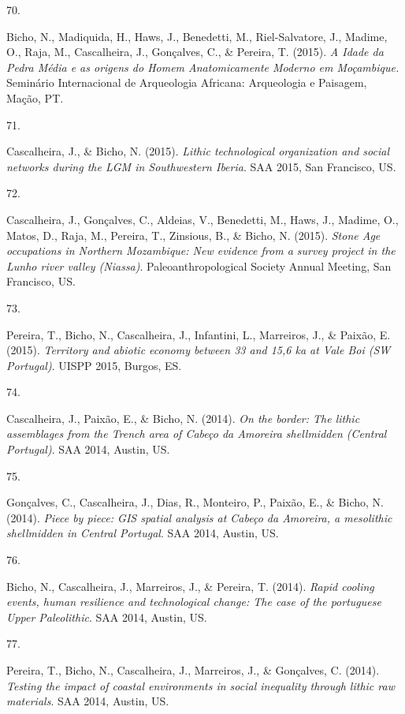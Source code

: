 \documentclass[11pt,a4paper,]{awesome-cv}
\newlength{\cslhangindent}
\newlength{\csllabelwidth}
\newenvironment{CSLReferences}[2] %
 {\begin{list}{}{%
  \setlength{\itemindent}{0pt}
  \setlength{\leftmargin}{0pt}
  \setlength{\parsep}{0pt}
  \ifodd #1
   \setlength{\leftmargin}{\cslhangindent}
   \setlength{\itemindent}{-1\cslhangindent}
  \fi
  \setlength{\itemsep}{#2\baselineskip}}}
 {\end{list}}
\newcommand{\CSLLeftMargin}[1]{\parbox[t]{\csllabelwidth}{\strut#1\strut}}
\newcommand{\CSLRightInline}[1]{\parbox[t]{\linewidth - \csllabelwidth}{\strut#1\strut}}
\begin{document}
\begin{CSLReferences}{0}{0}
\CSLLeftMargin{70. }%
\CSLRightInline{Bicho, N., Madiquida, H., Haws, J., Benedetti, M.,
Riel-Salvatore, J., Madime, O., Raja, M., Cascalheira, J., Gonçalves,
C., \& Pereira, T. (2015). \emph{A Idade da Pedra Média e as origens do
Homem Anatomicamente Moderno em Moçambique.} Seminário Internacional de
Arqueologia Africana: Arqueologia e Paisagem, Mação, PT.}

\CSLLeftMargin{71. }%
\CSLRightInline{Cascalheira, J., \& Bicho, N. (2015). \emph{Lithic
technological organization and social networks during the LGM in
Southwestern Iberia}. SAA 2015, San Francisco, US.}

\CSLLeftMargin{72. }%
\CSLRightInline{Cascalheira, J., Gonçalves, C., Aldeias, V., Benedetti,
M., Haws, J., Madime, O., Matos, D., Raja, M., Pereira, T., Zinsious,
B., \& Bicho, N. (2015). \emph{Stone Age occupations in Northern
Mozambique: New evidence from a survey project in the Lunho river valley
(Niassa)}. Paleoanthropological Society Annual Meeting, San Francisco,
US.}

\CSLLeftMargin{73. }%
\CSLRightInline{Pereira, T., Bicho, N., Cascalheira, J., Infantini, L.,
Marreiros, J., \& Paixão, E. (2015). \emph{Territory and abiotic economy
between 33 and 15,6 ka at Vale Boi (SW Portugal)}. UISPP 2015, Burgos,
ES.}

\CSLLeftMargin{74. }%
\CSLRightInline{Cascalheira, J., Paixão, E., \& Bicho, N. (2014).
\emph{On the border: The lithic assemblages from the Trench area of
Cabeço da Amoreira shellmidden (Central Portugal)}. SAA 2014, Austin,
US.}

\CSLLeftMargin{75. }%
\CSLRightInline{Gonçalves, C., Cascalheira, J., Dias, R., Monteiro, P.,
Paixão, E., \& Bicho, N. (2014). \emph{Piece by piece: GIS spatial
analysis at Cabeço da Amoreira, a mesolithic shellmidden in Central
Portugal}. SAA 2014, Austin, US.}

\CSLLeftMargin{76. }%
\CSLRightInline{Bicho, N., Cascalheira, J., Marreiros, J., \& Pereira,
T. (2014). \emph{Rapid cooling events, human resilience and
technological change: The case of the portuguese Upper Paleolithic}. SAA
2014, Austin, US.}

\CSLLeftMargin{77. }%
\CSLRightInline{Pereira, T., Bicho, N., Cascalheira, J., Marreiros, J.,
\& Gonçalves, C. (2014). \emph{Testing the impact of coastal
environments in social inequality through lithic raw materials}. SAA
2014, Austin, US.}


\end{CSLReferences}
\end{document}
